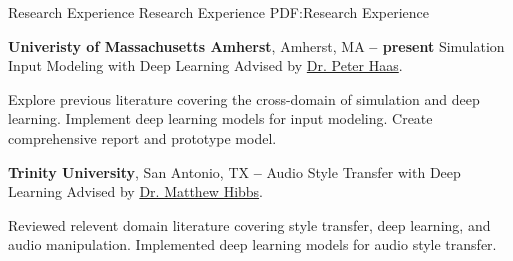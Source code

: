 \Section
{Research Experience}
{Research Experience}
{PDF:Research Experience}

\Entry
\textbf{Univeristy of Massachusetts Amherst},
Amherst, MA
\dotfill
\textbf{ -- present}
\Gap
Simulation Input Modeling with Deep Learning
\Gap
Advised by \href{https://people.cs.umass.edu/~phaas/}{Dr. Peter Haas}.
\begin{Detail}
    \SubBulletItem
    Explore previous literature covering the cross-domain of simulation and deep learning.
    \SubBulletItem
    Implement deep learning models for input modeling.
    \SubBulletItem
    Create comprehensive report and prototype model.
\end{Detail}

\BigGap
\Entry
\textbf{Trinity University},
San Antonio, TX
\dotfill
\textbf{ -- }
\Gap
Audio Style Transfer with Deep Learning
\Gap
Advised by \href{http://www.cs.trinity.edu/~mhibbs/}{Dr. Matthew Hibbs}.
\begin{Detail}
    \SubBulletItem
    Reviewed relevent domain literature covering style transfer, deep learning, and audio manipulation.
    \SubBulletItem
    Implemented deep learning models for audio style transfer.
\end{Detail}

